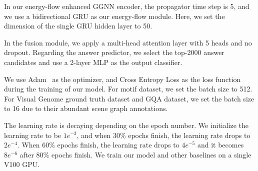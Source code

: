 \documentclass[letterpaper]{article} %
\begin{document}
In our energy-flow enhanced GGNN encoder, the propagator time step is 5, and we use a bidirectional GRU as our energy-flow module. 
Here, we set the dimension of the single GRU hidden layer to 50. 

In the fusion module, we apply a multi-head attention layer with 5 heads and no dropout. 
Regarding the answer predictor, we select the top-2000 answer candidates and use a 2-layer MLP as the output classifier.

We use Adam~\cite{kingma2014adam} as the optimizer, and Cross Entropy Loss as the loss function during the training of our model. 
For motif dataset, we set the batch size to 512. For Visual Genome ground truth dataset and GQA dataset, we set the batch size to 16 due to their abundant scene graph annotations.

The learning rate is decaying depending on the epoch number. We initialize the learning rate to be $1e^{-3}$, and when 30\% epochs finish, the learning rate drops to $2e^{-4}$. When 60\% epochs finish, the learning rate drops to $4e^{-5}$ and it becomes $8e^{-6}$ after 80\% epochs finish. We train our model and other baselines on a single V100 GPU.
\end{document}
